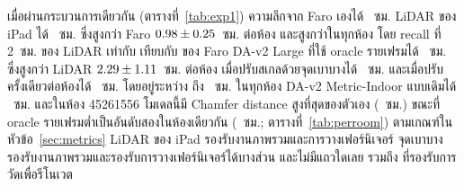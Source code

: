 เมื่อผ่านกระบวนการเดียวกัน (ตารางที่~\ref{tab:exp1}) ความลึกจาก Faro เองได้ \rsGTCM~ซม.
LiDAR ของ iPad ได้ \rsLIDARCM~ซม. ซึ่งสูงกว่า Faro $0.98 \pm 0.25$~ซม. ต่อห้อง
และสูงกว่าในทุกห้อง โดย recall ที่ 2~ซม. ของ LiDAR เท่ากับ \rsLIDARRtwo{} เทียบกับ \rsGTRtwo{} ของ Faro
\mbox{DA-v2} Large ที่ใช้ oracle รายเฟรมได้ \rsORACLECM~ซม. ซึ่งสูงกว่า LiDAR
$2.29 \pm 1.11$~ซม. ต่อห้อง เมื่อปรับสเกลด้วยจุดเบาบางได้ \rsSPARSECM~ซม.
และเมื่อปรับครั้งเดียวต่อห้องได้ \rsSCENECM~ซม. โดยอยู่ระหว่าง \rsSCENEc{} ถึง \rsSCENEb~ซม. ในทุกห้อง
\mbox{DA-v2} Metric-Indoor แบบเดิมได้ \rsMETRICCM~ซม. และในห้อง 45261556 โมเดลนี้มี Chamfer distance
สูงที่สุดของตัวเอง (\rsMETRICf~ซม.) ขณะที่ oracle รายเฟรมต่ำเป็นอันดับสองในห้องเดียวกัน
(\rsORACLEf~ซม.; ตารางที่~\ref{tab:perroom}) ตามเกณฑ์ในหัวข้อ~\ref{sec:metrics} LiDAR ของ iPad
รองรับงานภาพรวมและการวางเฟอร์นิเจอร์ จุดเบาบางรองรับงานภาพรวมและรองรับการวางเฟอร์นิเจอร์ได้บางส่วน
และไม่มีแถวใดเลย รวมถึง \ftmain{} ที่รองรับการวัดเพื่อรีโนเวต

